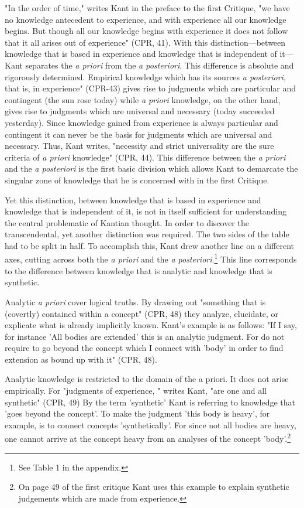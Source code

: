 "In the order of time," writes Kant in the preface to the first Critique, "we have no knowledge antecedent to experience, and with experience all our knowledge begins. But though all our knowledge begins with experience it does not follow that it all arises out of experience" (CPR, 41). With this distinction---between knowledge that is based in experience and knowledge that is independent of it---Kant separates the \textit{a priori} from the \textit{a posteriori}. This difference is absolute and rigorously determined. Empirical knowledge which has its sources \textit{a posteriori}, that is, in experience" (CPR-43) gives rise to judgments which are particular and contingent (the sun rose today) while \textit{a priori} knowledge, on the other hand, gives rise to judgments which are universal and necessary (today succeeded yesterday). Since knowledge gained from experience is always particular and contingent it can never be the basis for judgments which are universal and necessary. Thus, Kant writes, "necessity and strict universality are the sure criteria of \textit{a priori} knowledge" (CPR, 44). This difference between the \textit{a priori} and the \textit{a posteriori} is the first basic division which allows Kant to demarcate the singular zone of knowledge that he is concerned with in the first Critique.

Yet this distinction, between knowledge that is based in experience and knowledge that is independent of it, is not in itself sufficient for understanding the central problematic of Kantian thought. In order to discover the transcendental, yet another distinction was required. The two sides of the table had to be split in half. To accomplish this, Kant drew another line on a different axes, cutting across both the \textit{a priori} and the \textit{a posteriori}.\footnote{See Table 1 in the appendix.} This line corresponds to the difference between knowledge that is analytic and knowledge that is synthetic. 

Analytic \textit{a priori} cover logical truths. By drawing out "something that is (covertly) contained within a concept" (CPR, 48) they analyze, elucidate, or explicate what is already implicitly known. Kant's example is as follows: "If I say, for instance 'All bodies are extended' this is an analytic judgment. For do not require to go beyond the concept which I connect with 'body' in order to find extension as bound up with it" (CPR, 48).

Analytic knowledge is restricted to the domain of the a priori. It does not arise empirically. For "judgments of experience, " writes Kant, "are one and all synthetic" (CPR, 49) By the term 'synthetic' Kant is referring to knowledge that 'goes beyond the concept'. To make the judgment 'this body is heavy', for example, is to connect concepts 'synthetically'. For since not all bodies are heavy, one cannot arrive at the concept heavy from an analyses of the concept 'body'.\footnote{On page 49 of the first critique Kant uses this example to explain synthetic judgements which are made from experience.}


